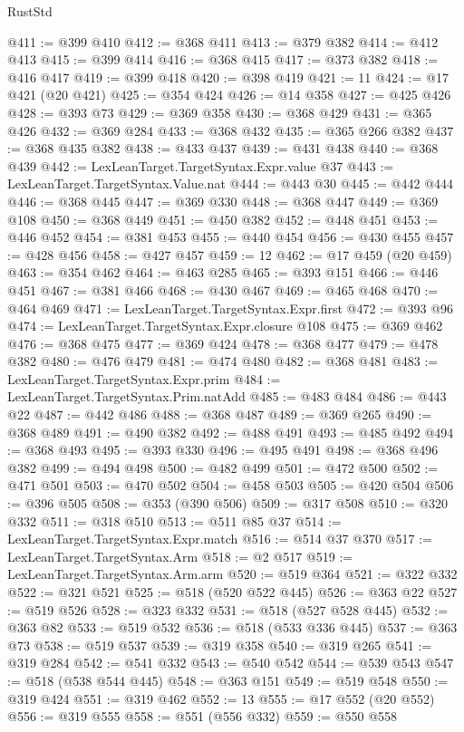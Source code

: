 \begin{lexlean}{RustStd}
\begin{coremodule}
@411 := @399 @410
@412 := @368 @411
@413 := @379 @382
@414 := @412 @413
@415 := @399 @414
@416 := @368 @415
@417 := @373 @382
@418 := @416 @417
@419 := @399 @418
@420 := @398 @419
@421 := 11
@424 := @17 @421 (@20 @421)
@425 := @354 @424
@426 := @14 @358
@427 := @425 @426
@428 := @393 @73
@429 := @369 @358
@430 := @368 @429
@431 := @365 @426
@432 := @369 @284
@433 := @368 @432
@435 := @365 @266 @382
@437 := @368 @435 @382
@438 := @433 @437
@439 := @431 @438
@440 := @368 @439
@442 := LexLeanTarget.TargetSyntax.Expr.value @37
@443 := LexLeanTarget.TargetSyntax.Value.nat
@444 := @443 @30
@445 := @442 @444
@446 := @368 @445
@447 := @369 @330
@448 := @368 @447
@449 := @369 @108
@450 := @368 @449
@451 := @450 @382
@452 := @448 @451
@453 := @446 @452
@454 := @381 @453
@455 := @440 @454
@456 := @430 @455
@457 := @428 @456
@458 := @427 @457
@459 := 12
@462 := @17 @459 (@20 @459)
@463 := @354 @462
@464 := @463 @285
@465 := @393 @151
@466 := @446 @451
@467 := @381 @466
@468 := @430 @467
@469 := @465 @468
@470 := @464 @469
@471 := LexLeanTarget.TargetSyntax.Expr.first
@472 := @393 @96
@474 := LexLeanTarget.TargetSyntax.Expr.closure @108
@475 := @369 @462
@476 := @368 @475
@477 := @369 @424
@478 := @368 @477
@479 := @478 @382
@480 := @476 @479
@481 := @474 @480
@482 := @368 @481
@483 := LexLeanTarget.TargetSyntax.Expr.prim
@484 := LexLeanTarget.TargetSyntax.Prim.natAdd
@485 := @483 @484
@486 := @443 @22
@487 := @442 @486
@488 := @368 @487
@489 := @369 @265
@490 := @368 @489
@491 := @490 @382
@492 := @488 @491
@493 := @485 @492
@494 := @368 @493
@495 := @393 @330
@496 := @495 @491
@498 := @368 @496 @382
@499 := @494 @498
@500 := @482 @499
@501 := @472 @500
@502 := @471 @501
@503 := @470 @502
@504 := @458 @503
@505 := @420 @504
@506 := @396 @505
@508 := @353 (@390 @506)
@509 := @317 @508
@510 := @320 @332
@511 := @318 @510
@513 := @511 @85 @37
@514 := LexLeanTarget.TargetSyntax.Expr.match
@516 := @514 @37 @370
@517 := LexLeanTarget.TargetSyntax.Arm
@518 := @2 @517
@519 := LexLeanTarget.TargetSyntax.Arm.arm
@520 := @519 @364
@521 := @322 @332
@522 := @321 @521
@525 := @518 (@520 @522 @445)
@526 := @363 @22
@527 := @519 @526
@528 := @323 @332
@531 := @518 (@527 @528 @445)
@532 := @363 @82
@533 := @519 @532
@536 := @518 (@533 @336 @445)
@537 := @363 @73
@538 := @519 @537
@539 := @319 @358
@540 := @319 @265
@541 := @319 @284
@542 := @541 @332
@543 := @540 @542
@544 := @539 @543
@547 := @518 (@538 @544 @445)
@548 := @363 @151
@549 := @519 @548
@550 := @319 @424
@551 := @319 @462
@552 := 13
@555 := @17 @552 (@20 @552)
@556 := @319 @555
@558 := @551 (@556 @332)
@559 := @550 @558

\end{coremodule}
\end{lexlean}
